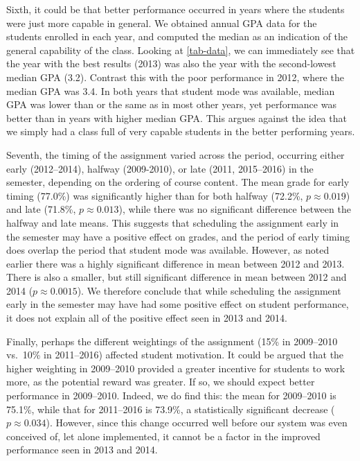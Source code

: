 \documentclass[sigconf, authordraft, capitalise]{acmart}
\begin{document}
Sixth, it could be that better performance occurred in years where the students were just more capable in general. We obtained annual GPA data for the students enrolled in each year, and computed the median as an indication of the general capability of the class. Looking at \cref{tab-data}, we can immediately see that the year with the best results (2013) was also the year with the second-lowest median GPA (3.2). Contrast this with the poor performance in 2012, where the median GPA was 3.4. In both years that student mode was available, median GPA was lower than or the same as in most other years, yet performance was better than in years with higher median GPA. This argues against the idea that we simply had a class full of very capable students in the better performing years.

Seventh, the timing of the assignment varied across the period, occurring either early (2012--2014), halfway (2009-2010), or late (2011, 2015--2016) in the semester, depending on the ordering of course content. The mean grade for early timing (77.0\%) was significantly higher than for both halfway (72.2\%, \(p \approx 0.019\)) and late (71.8\%, \(p \approx 0.013\)), while there was no significant difference between the halfway and late means. This suggests that scheduling the assignment early in the semester may have a positive effect on grades, and the period of early timing does overlap the period that student mode was available. However, as noted earlier there was a highly significant difference in mean between 2012 and 2013. There is also a smaller, but still significant difference in mean between 2012 and 2014 (\(p \approx 0.0015\)). We therefore conclude that while scheduling the assignment early in the semester may have had some positive effect on student performance, it does not explain all of the positive effect seen in 2013 and 2014.

Finally, perhaps the different weightings of the assignment (15\% in 2009--2010 vs.\ 10\% in 2011--2016) affected student motivation. It could be argued that the higher weighting in 2009--2010 provided a greater incentive for students to work more, as the potential reward was greater. If so, we should expect better performance in 2009--2010. Indeed, we do find this: the mean for 2009--2010 is 75.1\%, while that for 2011--2016 is 73.9\%, a statistically significant decrease (\(p \approx 0.034\)). However, since this change occurred well before our system was even conceived of, let alone implemented, it cannot be a factor in the improved performance seen in 2013 and 2014.
\end{document}
